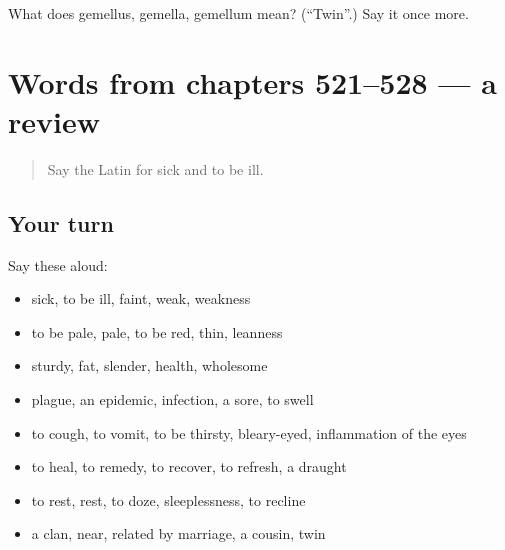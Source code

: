 \begin{tcolorbox}[breakable,colback=teal!4,colframe=teal!35!black,title={Before you move on}]
What does gemellus, gemella, gemellum mean? (\textquotedblleft{}Twin\textquotedblright{}.) Say it once more.
\end{tcolorbox}
\section[(dialogue)]{Words from chapters 521–528 — a review}

\label{lesson:LA-R528-review-521-528}



\begin{quote}
Say the Latin for sick and to be ill.
\end{quote}

\subsection*{Your turn}
Say these aloud:

\begin{itemize}
\raggedright
  \item sick, to be ill, faint, weak, weakness
  \item to be pale, pale, to be red, thin, leanness
  \item sturdy, fat, slender, health, wholesome
  \item plague, an epidemic, infection, a sore, to swell
  \item to cough, to vomit, to be thirsty, bleary-eyed, inflammation of the eyes
  \item to heal, to remedy, to recover, to refresh, a draught
  \item to rest, rest, to doze, sleeplessness, to recline
  \item a clan, near, related by marriage, a cousin, twin
\end{itemize}

